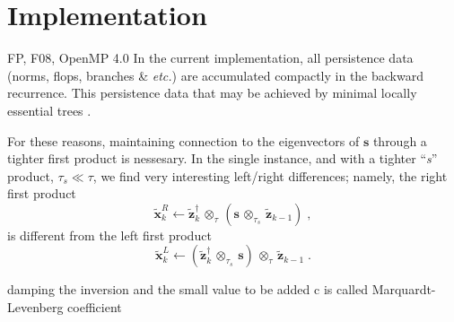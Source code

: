 \documentclass[letterpaper,twocolumn,amsmath,amsfont,amssymb,english,aps,jcp,preprintnumbers,groupaddress,nofootinbib,tightenlines,floatfix]{revtex4}
\newcommand{\mat}[1]{\boldsymbol{#1}}
\newcommand{\ot}{  {\scriptstyle \otimes}_{ \tau } }
\newcommand{\ots}{ {\scriptstyle \otimes}_{ \! \tau_s } }
\theoremstyle{plain}
\theoremstyle{remark}
\theoremstyle{plain}
\begin{document}
\section{Implementation}


FP, F08, OpenMP 4.0
In the current implementation, all persistence data
(norms, flops, branches \& {\em etc.}) are accumulated compactly in the backward recurrence.  This persistence data
 that may be achieved by minimal locally essential trees \cite{}.



For these reasons, maintaining connection to the eigenvectors of $\mat{s}$ through 
a tighter first product is nessesary.  In the single instance, and with a 
tighter ``{\em s}'' product, $\tau_s \ll \tau$, we find very interesting left/right differences; 
namely, the right first product 
\begin{equation} 
\widetilde{\mat{x}}^R_k \leftarrow \widetilde{\mat{z}}^\dagger_{k} \, \ot  \, \left( \mat{s} \,  \ots \, \widetilde{\mat{z}}_{k-1}  \right) \; ,
\end{equation}
is  different from the left first product 
\begin{equation} 
\widetilde{\mat{x}}^L_k \leftarrow \left(  \widetilde{\mat{z}}^\dagger_{k} \, \ots \, \mat{s} \right) \,  \ot  \, \widetilde{\mat{z}}_{k-1} \; .
\end{equation}

damping the inversion and the small value to be added c is called Marquardt-Levenberg coefficient

\end{document}
